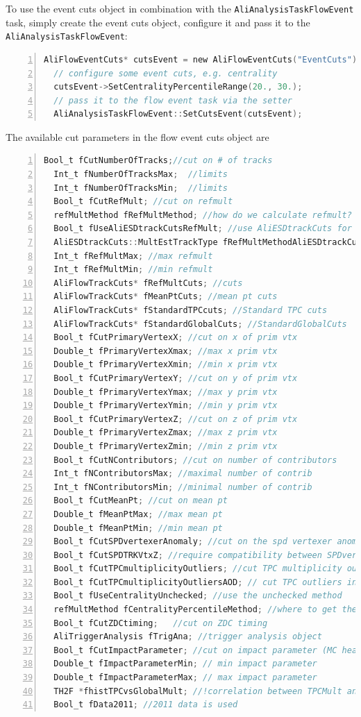 \documentclass[a4paper]{book}
\numberwithin{equation}{subsection}
\begin{document}
To use the event cuts object in combination with the \texttt{AliAnalysisTaskFlowEvent} task, simply create the event cuts object, configure it and pass it to the \texttt{AliAnalysisTaskFlowEvent}:
\begin{lstlisting}[language=C, numbers=left]
  AliFlowEventCuts* cutsEvent = new AliFlowEventCuts("EventCuts");
  // configure some event cuts, e.g. centrality
  cutsEvent->SetCentralityPercentileRange(20., 30.);
  // pass it to the flow event task via the setter
  AliAnalysisTaskFlowEvent::SetCutsEvent(cutsEvent);\end{lstlisting}

  The available cut parameters in the flow event cuts object are
\begin{lstlisting}[language=C, numbers=left]
  Bool_t fCutNumberOfTracks;//cut on # of tracks
  Int_t fNumberOfTracksMax;  //limits
  Int_t fNumberOfTracksMin;  //limits
  Bool_t fCutRefMult; //cut on refmult
  refMultMethod fRefMultMethod; //how do we calculate refmult?
  Bool_t fUseAliESDtrackCutsRefMult; //use AliESDtrackCuts for refmult calculation
  AliESDtrackCuts::MultEstTrackType fRefMultMethodAliESDtrackCuts;
  Int_t fRefMultMax; //max refmult
  Int_t fRefMultMin; //min refmult
  AliFlowTrackCuts* fRefMultCuts; //cuts
  AliFlowTrackCuts* fMeanPtCuts; //mean pt cuts
  AliFlowTrackCuts* fStandardTPCcuts; //Standard TPC cuts
  AliFlowTrackCuts* fStandardGlobalCuts; //StandardGlobalCuts
  Bool_t fCutPrimaryVertexX; //cut on x of prim vtx
  Double_t fPrimaryVertexXmax; //max x prim vtx
  Double_t fPrimaryVertexXmin; //min x prim vtx
  Bool_t fCutPrimaryVertexY; //cut on y of prim vtx
  Double_t fPrimaryVertexYmax; //max y prim vtx
  Double_t fPrimaryVertexYmin; //min y prim vtx
  Bool_t fCutPrimaryVertexZ; //cut on z of prim vtx
  Double_t fPrimaryVertexZmax; //max z prim vtx
  Double_t fPrimaryVertexZmin; //min z prim vtx
  Bool_t fCutNContributors; //cut on number of contributors
  Int_t fNContributorsMax; //maximal number of contrib
  Int_t fNContributorsMin; //minimal number of contrib
  Bool_t fCutMeanPt; //cut on mean pt
  Double_t fMeanPtMax; //max mean pt
  Double_t fMeanPtMin; //min mean pt
  Bool_t fCutSPDvertexerAnomaly; //cut on the spd vertexer anomaly
  Bool_t fCutSPDTRKVtxZ; //require compatibility between SPDvertexz TRKvertexz
  Bool_t fCutTPCmultiplicityOutliers; //cut TPC multiplicity outliers
  Bool_t fCutTPCmultiplicityOutliersAOD; // cut TPC outliers in 10h or 11h aod
  Bool_t fUseCentralityUnchecked; //use the unchecked method
  refMultMethod fCentralityPercentileMethod; //where to get the percentile from
  Bool_t fCutZDCtiming;   //cut on ZDC timing
  AliTriggerAnalysis fTrigAna; //trigger analysis object
  Bool_t fCutImpactParameter; //cut on impact parameter (MC header)
  Double_t fImpactParameterMin; // min impact parameter
  Double_t fImpactParameterMax; // max impact parameter
  TH2F *fhistTPCvsGlobalMult; //!correlation between TPCMult and GlobalMult
  Bool_t fData2011; //2011 data is used\end{lstlisting}
\end{document}
